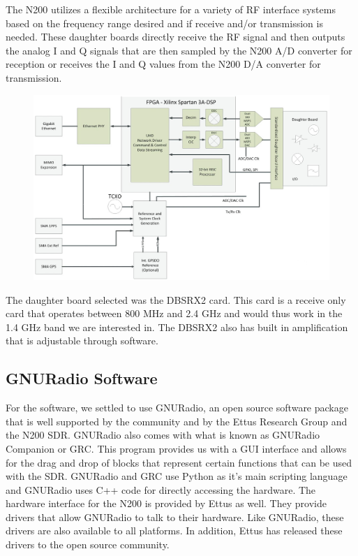 The N200 utilizes a flexible architecture for a variety of RF interface systems based on the frequency range desired and if receive and/or transmission is needed.  These daughter boards directly receive the RF signal and then outputs the analog I and Q signals that are then sampled by the N200 A/D converter for reception or receives the I and Q values from the N200 D/A converter for transmission. 

 {\begin{figure}[h!tb] 
\centering
\includegraphics[width=14cm]{Images/n200_block_edited}
\label{N200_block}
\end{figure}
}

The daughter board selected was the DBSRX2 card.  This card is a receive only card that operates between 800 MHz and 2.4 GHz and would thus work in the 1.4 GHz band we are interested in.  The DBSRX2 also has built in amplification that is adjustable through software.

\subsection{GNURadio Software}

For the software, we settled to use GNURadio, an open source software package that is well supported by the community and by the Ettus Research Group and the N200 SDR.  GNURadio also comes with what is known as GNURadio Companion or GRC.  This program provides us with a GUI interface and allows for the drag and drop of blocks that represent certain functions that can be used with the SDR.  GNURadio and GRC use Python as it's main scripting language and GNURadio uses C++ code for directly accessing the hardware.  The hardware interface for the N200 is provided by Ettus as well.  They provide drivers that allow GNURadio to talk to their hardware.  Like GNURadio, these drivers are also available to all platforms.  In addition, Ettus has released these drivers to the open source community.


